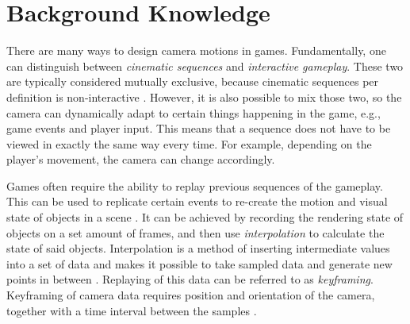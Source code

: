 \section{Background Knowledge}

There are many ways to design camera motions in games. Fundamentally, one can distinguish between \textit{cinematic sequences} and \textit{interactive gameplay}. These two are typically considered mutually exclusive, because cinematic sequences per definition is non-interactive \cite{haigh-hutchinson_real-time_2009}. However, it is also possible to mix those two, so the camera can dynamically adapt to certain things happening in the game, e.g., game events and player input. This means that a sequence does not have to be viewed in exactly the same way every time. For example, depending on the player's movement, the camera can change accordingly.


Games often require the ability to replay previous sequences of the gameplay. This can be used to replicate certain events to re-create the motion and visual state of objects in a scene \cite{haigh-hutchinson_real-time_2009}. It can be achieved by recording the rendering state of objects on a set amount of frames, and then use \textit{interpolation} to calculate the state of said objects. Interpolation is a method of inserting intermediate values into a set of data and makes it possible to take sampled data and generate new points in between \cite{haigh-hutchinson_real-time_2009}. Replaying of this data can be referred to as \textit{keyframing}. Keyframing of camera data requires position and orientation of the camera, together with a time interval between the samples \cite{haigh-hutchinson_real-time_2009}.